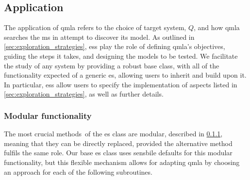 \subsection{Application}\label{sec:application}
The application of \gls{qmla} refers to the choice of target system, $Q$, and how \gls{qmla} searches the 
    \gls{ms} in attempt to discover its model. 
As outlined in \cref{sec:exploration_strategies}, \glspl{es} play the role of 
    defining \gls{qmla}'s objectives, guiding the steps it takes, and designing the models to be tested. 
We facilitate the study of any system by providing a robust  base class,
    with all of the functionality expected of a generic \gls{es}, allowing users to inherit and build upon it. 
In particular, \glspl{es} allow users to specify the implementation of aspects listed in \cref{sec:exploration_strategies}, 
    as well as further details.
\par 


\subsubsection{Modular functionality}\label{sec:modular_functionality}
The most crucial methods\footnotemark \ of the \gls{es} class are modular, 
    described in \cref{sec:modular_functionality},
    meaning that they can be directly replaced, provided the alternative method fulfils the same role. 
Our base \gls{es} class uses sensbile defaults for this modular functionality, 
    but this flexible mechanism allows for adapting \gls{qmla} by choosing an approach for each 
    of the following subroutines. 

